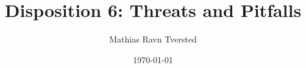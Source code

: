 

\title{Disposition 6: Threats and Pitfalls}   
\author{Mathias Ravn Tversted} 
\date{\today} 






\frame{\titlepage} 



